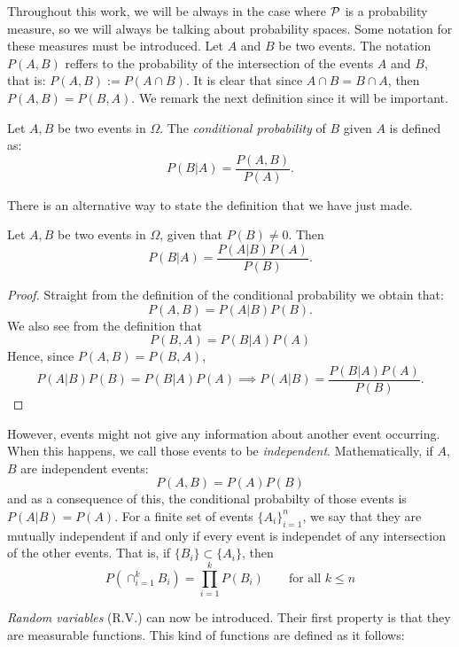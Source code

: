 Throughout this work, we will be always in the case where $\mathcal{P}$ is a probability measure, so we will always be talking about probability spaces. Some notation for these measures must be introduced. Let $A$ and $B$ be two events.
The notation $P(A,B)$ reffers to the probability of the intersection of the events $A$ and $B$, that is: $P(A,B) := P(A\cap B)$.
 It is clear that since $A \cap B = B \cap A$, then $P(A,B) = P(B,A)$. We remark the next definition since it will be important.

\begin{ndef}
Let $A,B$ be two events in $\Omega$. The \emph{conditional probability} of $B$ given $A$ is defined as:
$$
P(B|A) = \frac{P(A,B)}{P(A)}.
$$
\end{ndef}




There is an alternative way to state the definition that we have just made.

\begin{nth}
Let $A,B$ be two events in $\Omega$, given that $P(B) \neq 0$. Then
$$
P(B|A) = \frac{P(A|B) P(A)}{P(B)}.
$$
\end{nth}
\begin{proof}
Straight from the definition of the conditional probability we obtain that:
$$
P(A,B) = P(A|B)P(B).
$$
We also see from the definition that
$$
P(B,A) = P(B|A)P(A)
$$
Hence, since $P(A,B) = P(B,A)$,
$$
P(A|B)P(B) = P(B|A)P(A) \implies P(A|B) = \frac{P(B|A)P(A)}{P(B)}.
$$
\end{proof}


However, events might not give any information about another event occurring. When this happens, we call those events to be \emph{independent}. Mathematically, if $A$,$B$ are independent events:
$$
P(A,B) = P(A)P(B)
$$
and as a consequence of this, the conditional probabilty of those events is $P(A|B) = P(A)$. For a finite set of events $\{A_i\}_{i=1}^n$, we say that they are mutually independent if and only if every event is independet of any intersection of the other events. 
That is, if $\{B_i\} \subset \{A_i\}$, then
$$
P\left(\cap_{i = 1}^k B_i \right) = \prod_{i = 1}^k P(B_i) \quad \quad \text{for all } k \leq n
$$

\emph{Random variables} (R.V.) can now be introduced. Their first property is that they are measurable functions. This kind of functions are defined as it follows:

